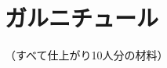 \hypertarget{garnitures-recettes}{%
\section{ガルニチュール}\label{garnitures-recettes}}


\begin{center}
（すべて仕上がり10人分の材料）
\end{center}
